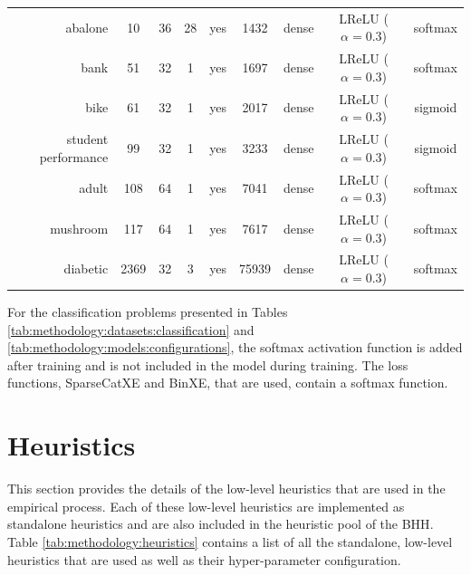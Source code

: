 \begin{table}[htbp]
{\begin{tabular}{rcccccccc}
                  abalone             & 10              & 36              & 28              & yes             & 1432                & dense             & LReLU ($\alpha = 0.3$) & softmax                \\
                  bank                & 51              & 32              & 1               & yes             & 1697                & dense             & LReLU ($\alpha = 0.3$) & softmax                \\
                  bike                & 61              & 32              & 1               & yes             & 2017                & dense             & LReLU ($\alpha = 0.3$) & sigmoid                \\
                  student performance & 99              & 32              & 1               & yes             & 3233                & dense             & LReLU ($\alpha = 0.3$) & sigmoid                \\
                  adult               & 108             & 64              & 1               & yes             & 7041                & dense             & LReLU ($\alpha = 0.3$) & softmax                \\
                  mushroom            & 117             & 64              & 1               & yes             & 7617                & dense             & LReLU ($\alpha = 0.3$) & softmax                \\
                  diabetic            & 2369            & 32              & 3               & yes             & 75939               & dense             & LReLU ($\alpha = 0.3$) & softmax                \\
            \end{tabular}%
      }
\end{table}%

For the classification problems presented in Tables \ref{tab:methodology:datasets:classification} and \ref{tab:methodology:models:configurations}, the softmax activation function is added after training and is not included in the model during training. The loss functions, \acf{SparseCatXE} and \acf{BinXE}, that are used, contain a softmax function.

\section{Heuristics}\label{sec:methodology:heuristics}

This section provides the details of the low-level heuristics that are used in the empirical process. Each of these low-level heuristics are implemented as standalone heuristics and are also included in the heuristic pool of the \acs{BHH}. Table \ref{tab:methodology:heuristics} contains a list of all the standalone, low-level heuristics that are used as well as their hyper-parameter configuration.

